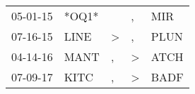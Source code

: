 \begin{supertabular}{lllll}
 05-01-15 &  *OQ1* &               &             , &   MIR \\
 07-16-15 &   LINE &  \textgreater &             , &  PLUN \\
 04-14-16 &   MANT &             , &  \textgreater &  ATCH \\
 07-09-17 &   KITC &             , &  \textgreater &  BADF \\
\end{supertabular}
